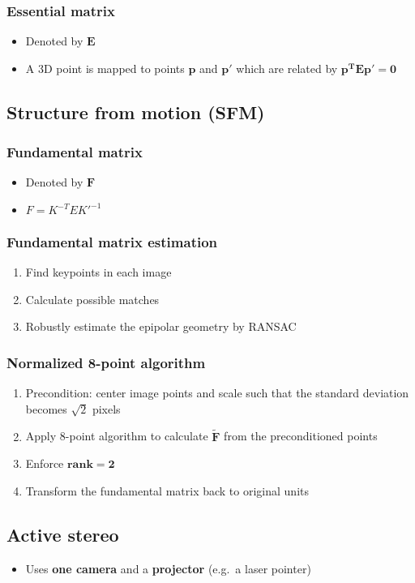 \documentclass{article}
\begin{document}
        \subsubsection{Essential matrix}
        \begin{itemize}
            \item Denoted by $\mathbf{E}$
            \item A 3D point is mapped to points $\mathbf{p}$ and $\mathbf{p'}$ which are related by $\mathbf{p^T E p' = 0}$ 
        \end{itemize}

    \subsection{Structure from motion (SFM)}
    
        \subsubsection{Fundamental matrix}
        \begin{itemize}
            \item Denoted by $\mathbf{F}$
            \item $F = K^{-T} E K'^{-1}$
        \end{itemize}

        \subsubsection{Fundamental matrix estimation}
        \begin{enumerate}
            \item Find keypoints in each image
            \item Calculate possible matches
            \item Robustly estimate the epipolar geometry by RANSAC
        \end{enumerate}
    
        \subsubsection{Normalized 8-point algorithm}
        \begin{enumerate}
            \item Precondition: center image points and scale such that the standard deviation becomes $\sqrt{2}$ pixels
            \item Apply 8-point algorithm to calculate $\mathbf{\tilde{F}}$ from the preconditioned points
            \item Enforce $\mathbf{\textbf{rank}=2}$
            \item Transform the fundamental matrix back to original units
        \end{enumerate}

    \subsection{Active stereo}
    \begin{itemize}
        \item Uses \textbf{one camera} and a \textbf{projector} (e.g.\ a laser pointer)
    \end{itemize}
\end{document}
